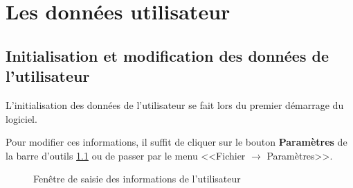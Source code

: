 \chapter{Les données utilisateur}
\section{Initialisation et modification des données de l'utilisateur}
L'initialisation des données de l'utilisateur se fait lors du premier démarrage du logiciel.

Pour modifier ces informations, il suffit de cliquer sur le bouton \textbf{Paramètres} de la barre d'outils \ref{fig:modifierUtilisateur} ou de passer par le menu <<Fichier $\rightarrow$ Paramètres>>. 

\begin{figure}[H]
	\centering
	\caption{Fenêtre de saisie des informations de l'utilisateur}
	\label{fig:modifierUtilisateur}
\end{figure}